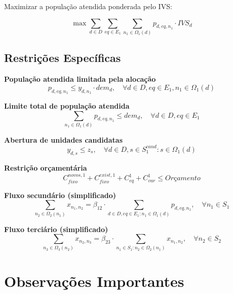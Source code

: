 \documentclass{article}
\begin{document}
Maximizar a população atendida ponderada pelo IVS:

\begin{equation}
\max \sum_{d \in D} \sum_{eq \in E_1} \sum_{n_1 \in \Omega_1(d)} p_{d,eq,n_1} \cdot IVS_d
\end{equation}

\subsection{Restrições Específicas}

\textbf{População atendida limitada pela alocação}
\begin{equation}
p_{d,eq,n_1} \leq y_{d,n_1} \cdot dem_d, \quad \forall d \in D, eq \in E_1, n_1 \in \Omega_1(d) \tag{11}
\end{equation}

\textbf{Limite total de população atendida}
\begin{equation}
\sum_{n_1 \in \Omega_1(d)} p_{d,eq,n_1} \leq dem_d, \quad \forall d \in D, eq \in E_1 \tag{12}
\end{equation}

\textbf{Abertura de unidades candidatas}
\begin{equation}
y_{d,s} \leq z_s, \quad \forall d \in D, s \in S_1^{cand}: s \in \Omega_1(d) \tag{13}
\end{equation}

\textbf{Restrição orçamentária}
\begin{equation}
C_{fixo}^{novos,1} + C_{fixo}^{exist,1} + C_{eq}^1 + C_{var}^1 \leq Orçamento \tag{14}
\end{equation}

\textbf{Fluxo secundário (simplificado)}
\begin{equation}
\sum_{n_2 \in \Omega_2(n_1)} x_{n_1,n_2} = \beta_{12} \cdot \sum_{d \in D, eq \in E_1: n_1 \in \Omega_1(d)} p_{d,eq,n_1}, \quad \forall n_1 \in S_1 \tag{15}
\end{equation}

\textbf{Fluxo terciário (simplificado)}
\begin{equation}
\sum_{n_3 \in \Omega_3(n_2)} x_{n_2,n_3} = \beta_{23} \cdot \sum_{n_1 \in S_1: n_2 \in \Omega_2(n_1)} x_{n_1,n_2}, \quad \forall n_2 \in S_2 \tag{16}
\end{equation}

\section{Observações Importantes}
\end{document}

